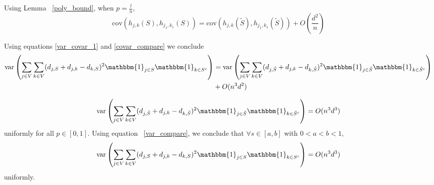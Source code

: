 \documentclass[final,12pt]{colt2018}
\begin{document}
Using Lemma ~\ref{poly_bound}, when $p = \frac{l}{n}$,
\begin{equation}
\mathrm{cov}(h_{j,k}(S),h_{j_1,k_1}(S)) = \mathrm{cov}(h_{j,k}(\tilde{S}),h_{j_1,k_1}(\tilde{S})) + O(\frac{d^2}{n})
\label{covar_compare}
\end{equation}



Using equations \ref{var_covar_1} and \ref{covar_compare} we conclude
\begin{align}
\mathrm{var}\left(\sum_{j\in V}\sum_{k \in V}(d_{j,S}+d_{j,k}-d_{k,S})^2\mathbbm{1}_{j\in S}\mathbbm{1}_{k \in S^c}\right) &= 
\mathrm{var}\left(\sum_{j\in V}\sum_{k \in V}(d_{j,\tilde{S}}+d_{j,k}-d_{k,\tilde{S}})^2\mathbbm{1}_{j\in \tilde{S}}\mathbbm{1}_{k \in \tilde{S}^c}\right) \nonumber \\ &+ O (n^3d^2) \label{var_compare}
\end{align}

\begin{lemma}
\label{stein_bound_2}
$$\mathrm{var}\left(\sum_{j\in V}\sum_{k \in V}(d_{j,\tilde{S}}+d_{j,k}-d_{k,\tilde{S}})^2\mathbbm{1}_{j\in \tilde{S}}\mathbbm{1}_{k \in \tilde{S}^c}\right)  = O(n^3d^3)$$ uniformly for all $p \in [0,1]$. Using equation ~\ref{var_compare}, we conclude that $\forall s \in [a,b]$ with $0<a<b<1$, 
$$\mathrm{var}\left(\sum_{j\in V}\sum_{k \in V}(d_{j,S}+d_{j,k}-d_{k,S})^2\mathbbm{1}_{j\in S}\mathbbm{1}_{k \in S^c}\right) = O(n^3d^3)$$ uniformly.
\end{lemma}
\end{document}
